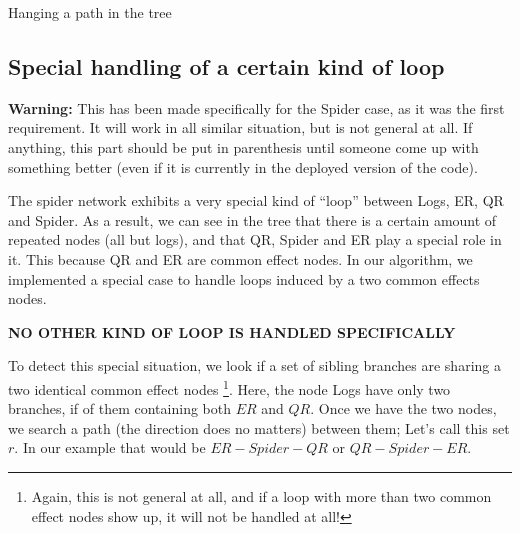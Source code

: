 \documentclass[a4paper]{article}
\newcommand*{\say}[1]{``{#1}''}
\begin{document}
\begin{algorithm2e}[H]
  \caption{Hanging a path in the tree}

\end{algorithm2e}


\subsection{Special handling of a certain kind of loop}

\textbf{Warning:} This has been made specifically for the Spider case, as it was the first requirement.
It will work in all similar situation, but is not general at all.
If anything, this part should be put in parenthesis until someone come up with something better
(even if it is currently in the deployed version of the code).

The spider network exhibits a very special kind of \say{loop} between Logs, ER, QR and Spider.
As a result, we can see in the tree that there is a certain amount of repeated nodes (all but logs),
and that QR, Spider and ER play a special role in it.
This because QR and ER are common effect nodes.
In our algorithm, we implemented a special case to handle loops induced by a two common effects nodes.
\begin{center}
\textbf{NO OTHER KIND OF LOOP IS HANDLED SPECIFICALLY}
\end{center}

To detect this special situation, we look if a set of sibling branches are sharing a two identical common effect nodes%
\footnote{Again, this is not general at all, and if a loop with more than two common effect nodes show up,
it will not be handled at all!}.
Here, the node Logs have only two branches, if of them containing both $ER$ and $QR$.
Once we have the two nodes, we search a path (the direction does no matters) between them;
Let's call this set $r$.
In our example that would be $ER - Spider - QR$ or $QR - Spider - ER$.
\end{document}

